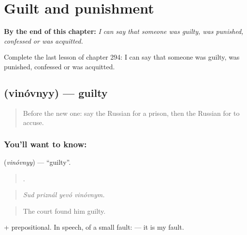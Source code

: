 
\chapter{Guilt and punishment}
\label{ch:ru-guilt-and-punishment}

\begin{chapteropening}
\textbf{By the end of this chapter:} \emph{I can say that someone was guilty, was punished, confessed or was acquitted.}

Complete the last lesson of chapter 294: I can say that someone was guilty, was punished, confessed or was acquitted.
\end{chapteropening}

\section[\texorpdfstring{\ru{виновный} (vinóvnyy)}{виновный (vinóvnyy)}]{ (vinóvnyy) — guilty}

\label{lesson:RU-C294-vinovnyy}



\begin{quote}
Before the new one: say the Russian for a prison, then the Russian for to accuse.
\end{quote}

\subsection*{You'll want to know: }
\textbf{} (\emph{vinóvnyy}) — \textquotedblleft{}guilty\textquotedblright{}.

\begin{quote}
   .
\end{quote}

\begin{quote}
\emph{Sud priznál yevó vinóvnym.}
\end{quote}

\begin{quote}
The court found him guilty.
\end{quote}

\emph{ } + prepositional. In speech, of a small fault: \emph{ } — it is my fault.

